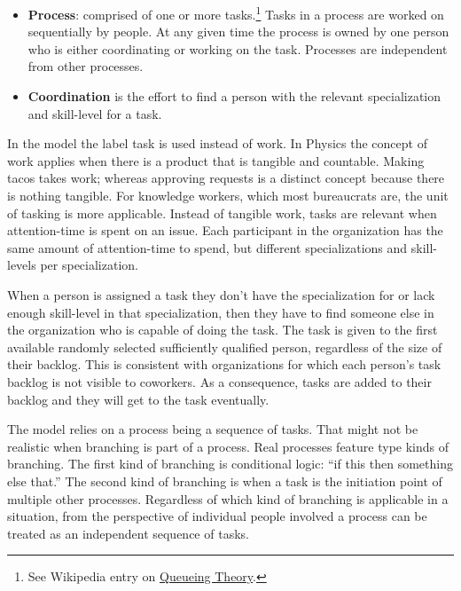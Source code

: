 \begin{itemize}
    \item \textbf{Process}: comprised of one or more tasks.\footnote{See Wikipedia entry on 
    \href{https://en.wikipedia.org/wiki/Queueing_theory}{Queueing Theory}.} Tasks in a process are worked on sequentially by people. At any given time the process is owned by one person who is either coordinating or working on the task. Processes are independent from other processes.
    \item \textbf{Coordination} is the effort to find a person with the relevant specialization and skill-level for a task. 
\end{itemize}

In the model the label task is used instead of work. In Physics the concept of work applies when there is a product that is tangible and countable. Making tacos takes work; whereas approving requests is a distinct concept because there is nothing tangible. For knowledge workers, which most bureaucrats are, the unit of tasking is more applicable. Instead of tangible work, tasks are relevant when \gls{attention-time} is spent on an issue.
Each participant in the organization has the same amount of attention-time to spend, but different specializations and skill-levels per specialization.


When a person is assigned a task they don't have the specialization for or lack enough skill-level in that specialization, then they have to find someone else in the organization who is capable of doing the task. 
The task is given to the first available randomly selected sufficiently qualified person, regardless of the size of their backlog.
This is consistent with organizations for which each person's task backlog is not visible to coworkers. As a consequence, tasks are added to their backlog and they will get to the task eventually.



The model relies on a process being a sequence of tasks. That might not be realistic when branching is part of a process. %
Real processes feature type kinds of branching. The first kind of branching is conditional logic: ``if this then something else that.''
The second kind of branching is when a task is the initiation point of multiple other processes. 
Regardless of which kind of branching is applicable in a situation, from the perspective of individual people involved a process can be treated as an independent sequence of tasks. 


